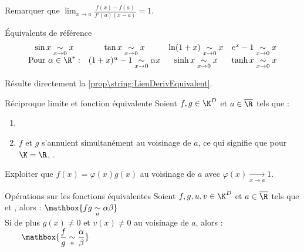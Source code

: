 \documentclass[12pt,a4paper]{report}
\begin{document}
\begin{demo}
    Remarquer que $\displaystyle\lim_{x \to a} \tfrac{f(x) - f(a)}{f'(a) (x - a)} = 1$.
\end{demo}
    
\begin{proposition}{\'Equivalents de référence}{}
    $$
    \begin{array}{cccc}
        \sin x \underset{x \to 0}{\sim} x & \tan x \underset{x \to 0}{\sim} x & \ln(1+x) \underset{x \to 0}{\sim} x & e^x - 1 \underset{x \to 0}{\sim} x \\
        \text{Pour } \alpha \in \R^* : & (1 + x)^\alpha -1 \underset{x \to 0}{\sim} \alpha x & \sinh x \underset{x \to 0}{\sim} x & \tanh x \underset{x \to 0}{\sim} x
    \end{array}
    $$
\end{proposition}

\begin{demo}
    Résulte directement la \cref{prop\string:LienDerivEquivalent}.
\end{demo}

\begin{proposition}{Réciproque limite et fonction équivalente}{}
    Soient $f, g \in \K^D$ et $a \in \overline{\R}$ tels que  :
    \begin{enumerate}
        \item {}
        \item $f$ et $g$ s'annulent simultanément au voisinage de $a$, ce qui signifie que pour $\K = \R$, .
    \end{enumerate}
\end{proposition}

\begin{demo}
    Exploiter que $f(x) = \varphi(x)g(x)$ au voisinage de $a$ avec $\varphi(x) \xrightarrow[x \to a]{} 1$.
\end{demo}

\begin{proposition}{Opérations sur les fonctions équivalentes}{}
    Soient $f, g, u, v \in \K^D$ et $a \in \overline{\R}$ tels que  et , alors : \hfill $\mathbox{fg \underset{a}{\sim} \alpha \beta}$ \hspace*{\fill}\smallskip\\
    Si de plus $g(x) \neq 0$ et $v(x) \neq 0$ au voisinage de $a$, alors : \hfill $ \qquad \mathbox{\dfrac{f}{g} \underset{a}{\sim} \dfrac{\alpha}{\beta}} $ \hspace*{\fill}
\end{proposition}
\end{document}
